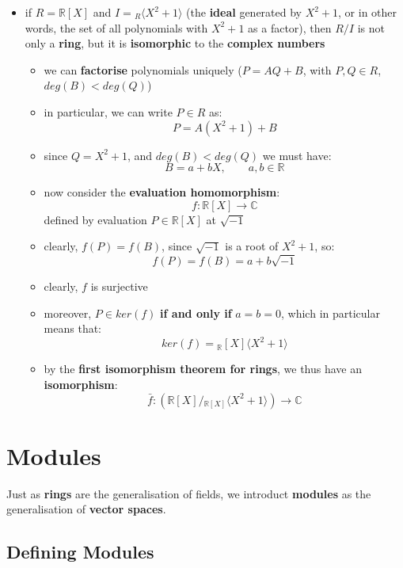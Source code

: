 \documentclass{exam}
\begin{document}
\begin{itemize}
    \item if $R = \mathbb{R}[X]$ and $I = {}_R\langle X^2 + 1 \rangle$ (the \textbf{ideal} generated by $X^2 + 1$, or in other words, the set of all polynomials with $X^2 + 1$ as a factor), then $R/I$ is not only a \textbf{ring}, but it is \textbf{isomorphic} to the \textbf{complex numbers}
    \begin{itemize}
        \item we can \textbf{factorise} polynomials uniquely ($P = AQ + B$, with $P,Q \in R$, $deg(B) < deg(Q)$)
        \item in particular, we can write $P \in R$ as:
        \[
        P = A(X^2 + 1) + B
        \]
        \item since $Q = X^2 + 1$, and $deg(B) < deg(Q)$ we must have:
        \[
        B = a + bX, \qquad a,b \in \mathbb{R} 
        \]
        \item now consider the \textbf{evaluation homomorphism}:
        \[
        f : \mathbb{R}[X] \to \mathbb{C}
        \]
        defined by evaluation $P \in \mathbb{R}[X]$ at $\sqrt{-1}$
        \item clearly, $f(P) = f(B)$, since $\sqrt{-1}$ is a root of $X^2 + 1$, so:
        \[
        f(P) = f(B) = a + b\sqrt{-1}
        \]
        \item clearly, $f$ is surjective
        \item moreover, $P \in ker(f)$ \textbf{if and only if} $a = b = 0$, which in particular means that:
        \[
        ker(f) = {}_\mathbb{R}[X]\langle X^2 + 1 \rangle
        \]
        \item by the \textbf{first isomorphism theorem for rings}, we thus have an \textbf{isomorphism}:
        \[
        \bar{f} : (\mathbb{R}[X] / {}_{\mathbb{R}[X]}\langle X^2 + 1 \rangle) \to \mathbb{C}
        \]
    \end{itemize}
\end{itemize}

\section{Modules}

Just as \textbf{rings} are the generalisation of fields, we introduct \textbf{modules} as the generalisation of\textbf{ vector spaces}.

\subsection{Defining Modules}
\end{document}
